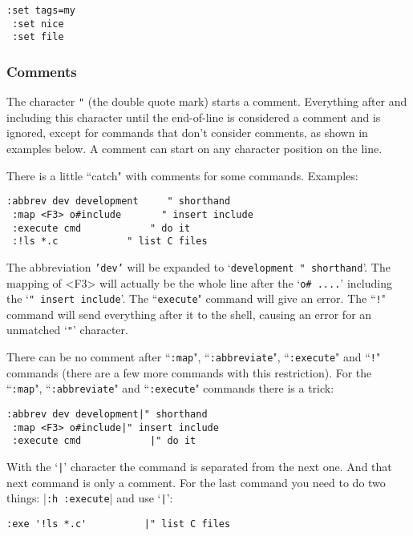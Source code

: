 \begin{Verbatim}[samepage=true]
 :set tags=my
 :set nice
 :set file
\end{Verbatim}

\subsubsection{Comments}
The character \texttt{"} (the double quote mark) starts a comment.
Everything after and including this character until the end-of-line is considered a comment and is ignored, except for commands that don't consider comments, as shown in examples below.
A comment can start on any character position on the line.

There is a little ``catch" with comments for some commands.
Examples:

\begin{Verbatim}[samepage=true]
 :abbrev dev development     " shorthand
 :map <F3> o#include       " insert include
 :execute cmd            " do it
 :!ls *.c            " list C files
\end{Verbatim}

The abbreviation \texttt{'dev'} will be expanded to `\texttt{development     " shorthand}'.
The mapping of <F3> will actually be the whole line after the `\texttt{o\# ....}' including the `\texttt{" insert include}'.
The ``\texttt{execute}" command will give an error.
The ``\texttt{!}" command will send everything after it to the shell, causing an error for an unmatched `\texttt{"}' character.

There can be no comment after ``\texttt{:map}", ``\texttt{:abbreviate}", ``\texttt{:execute}" and ``\texttt{!}" commands (there are a few more commands with this restriction).
For the ``\texttt{:map}", ``\texttt{:abbreviate}" and ``\texttt{:execute}" commands there is a trick:

\begin{Verbatim}[samepage=true]
 :abbrev dev development|" shorthand
 :map <F3> o#include|" insert include
 :execute cmd            |" do it
\end{Verbatim}

With the `\texttt{|}' character the command is separated from the next one.
And that next command is only a comment.
For the last command you need to do two things: |\texttt{:h :execute}| and use `\texttt{|}':

\begin{Verbatim}[samepage=true]
 :exe '!ls *.c'          |" list C files
\end{Verbatim}

